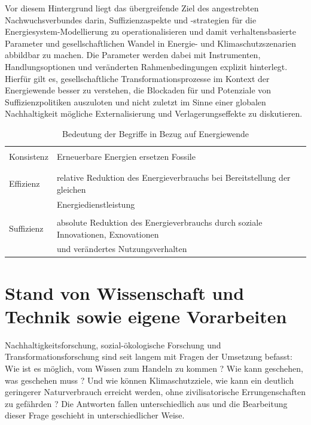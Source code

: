 \documentclass[a4paper,11pt,twoside]{scrartcl}
\begin{document}
Vor diesem Hintergrund liegt das übergreifende Ziel des angestrebten Nachwuchsverbundes darin, Suffizienzaspekte und -strategien für die Energiesystem-Modellierung zu operationalisieren und damit verhaltensbasierte Parameter und gesellschaftlichen Wandel in Energie- und Klimaschutzszenarien abbildbar zu machen. Die Parameter werden dabei mit Instrumenten, Handlungsoptionen und veränderten Rahmenbedingungen explizit hinterlegt. Hierfür gilt es, gesellschaftliche Transformationsprozesse im Kontext der Energiewende besser zu verstehen, die Blockaden für und Potenziale von Suffizienzpolitiken auszuloten und nicht zuletzt im Sinne einer globalen Nachhaltigkeit mögliche Externalisierung und Verlagerungseffekte zu diskutieren.

\begin{table}[h]
\begin{center}
\small
  \caption{Bedeutung der Begriffe in Bezug auf Energiewende}
\begin{tabular}[h]{|l | l |}
\hline
&\\
Konsistenz & Erneuerbare Energien ersetzen Fossile\\
&\\
\hline
&\\
 Effizienz & relative Reduktion des Energieverbrauchs bei Bereitstellung der gleichen\\
 & Energiedienstleistung\\
 \hline
 &\\
Suffizienz & absolute Reduktion des Energieverbrauchs durch soziale Innovationen, Exnovationen\\
& und verändertes Nutzungsverhalten \\
 \hline
 \end{tabular}
 \label{tab:koefsu}
\end{center}
\end{table}

\section{Stand von Wissenschaft und Technik sowie eigene Vorarbeiten}
\label{sec:2}

Nachhaltigkeitsforschung, sozial-ökologische Forschung und Transformationsforschung sind seit langem mit Fragen der Umsetzung befasst: Wie ist es möglich, vom Wissen zum Handeln zu kommen ? \cite{BMBF2008} Wie kann geschehen, was geschehen muss ? \cite{Linz2000} Und wie können Klimaschutzziele, wie kann ein deutlich geringerer Naturverbrauch erreicht werden, ohne zivilisatorische Errungenschaften zu gefährden ? \cite{Sommer2016,WGBU2011} Die Antworten fallen unterschiedlich aus und die Bearbeitung dieser Frage geschieht in unterschiedlicher Weise.
\end{document}
